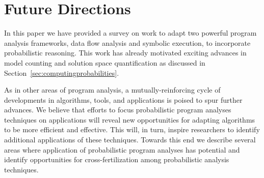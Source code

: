 \section{Future Directions}
\label{sec:future}

In this paper we have provided a survey on work to adapt two
powerful program analysis frameworks, data flow analysis and symbolic
execution, to incorporate probabilistic reasoning.  This work has
already motivated exciting advances in model counting and solution
space quantification as discussed in Section~\ref{sec:computingprobabilities}.

As in other areas of program analysis, a mutually-reinforcing cycle of
developments in algorithms, tools, and applications
is poised to spur further advances.  We believe that efforts to focus
probabilistic program analyses techniques on applications will reveal
new opportunities for adapting algorithms to be more efficient and
effective. This will, in turn, inspire researchers to identify
additional applications of these techniques.   Towards this end we
describe several areas where application of probabilistic program
analyses has potential and identify opportunities for cross-fertilization
among probabilistic analysis techniques.

